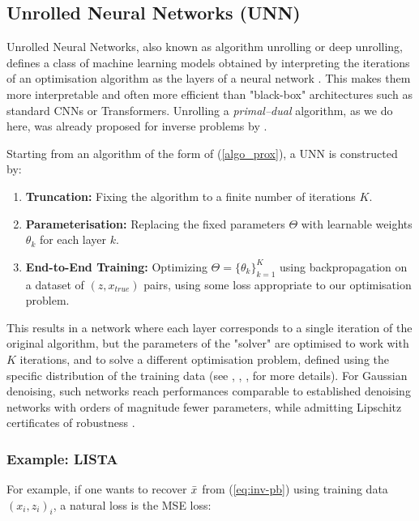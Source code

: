 \documentclass[a4paper,11pt]{article}
\theoremstyle{plain}{\theorembodyfont{\rmfamily}%
\newtheorem{proposition}[theorem]{Proposition}}
\theoremstyle{plain}{\theorembodyfont{\rmfamily}%
\newtheorem{notation}[theorem]{Notation}}
\theoremstyle{plain}{\theorembodyfont{\rmfamily}%
\newtheorem{assumption}[theorem]{Assumption}}
\theoremstyle{plain}{\theorembodyfont{\rmfamily}%
\newtheorem{problem}[theorem]{Problem}}
\theoremstyle{plain}{\theorembodyfont{\rmfamily}%
\newtheorem{example}[theorem]{Example}}
\theoremstyle{plain}{\theorembodyfont{\rmfamily}%
\newtheorem{remark}[theorem]{Remark}}
\theoremstyle{plain}{\theorembodyfont{\rmfamily}%
\newtheorem{definition}[theorem]{Definition}}
\theoremstyle{plain}{\theorembodyfont{\rmfamily}%
\newtheorem{question}[theorem]{Question}}
\numberwithin{equation}{section}
\begin{document}
\subsection{Unrolled Neural Networks (UNN)}
Unrolled Neural Networks, also known as algorithm unrolling or deep unrolling, defines a class of machine learning models obtained by interpreting the iterations of an optimisation algorithm as the layers of a neural network \cite{monga2021algorithm}. This makes them more interpretable and often more efficient than "black-box" architectures such as standard CNNs or Transformers. Unrolling a \emph{primal--dual} algorithm, as we do here, was already proposed for inverse problems by \cite{adler2018learned}.

Starting from an algorithm of the form of (\ref{algo_prox}), a UNN is constructed by:
\begin{enumerate}
    \item \textbf{Truncation:} Fixing the algorithm to a finite number of iterations $K$.
    \item \textbf{Parameterisation:} Replacing the fixed parameters $\Theta$ with learnable weights $\theta_k$ for each layer $k$.
    \item \textbf{End-to-End Training:} Optimizing $\Theta = \{\theta_k\}_{k=1}^K$ using backpropagation on a dataset of $(z, x_{true})$ pairs, using some loss appropriate to our optimisation problem.
\end{enumerate}

This results in a network where each layer corresponds to a single iteration of the original algorithm, but the parameters of the "solver" are optimised to work with $K$ iterations, and to solve a different optimisation problem, defined using the specific distribution of the training data (see \cite{gregor2010learning}, \cite{le2024unfolded}, \cite{repetti_eusipco}, \cite{monga2021algorithm} for more details). For Gaussian denoising, such networks reach performances comparable to established denoising networks with orders of magnitude fewer parameters, while admitting Lipschitz certificates of robustness \cite{le2024unfolded, pesquet2021learning}.

\subsubsection{Example: LISTA}

For example, if one wants to recover $\Bar{x}$ from (\ref{eq:inv-pb}) using training data $(x_i, z_i)_i$, a natural loss is the MSE loss:
\end{document}
